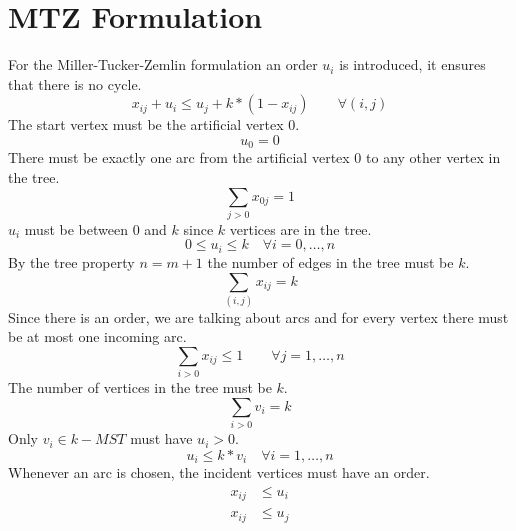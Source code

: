 \documentclass[a4paper]{article}
\numberwithin{equation}{section}
\begin{document}
\section{MTZ Formulation}
For the Miller-Tucker-Zemlin formulation an order $u_i$ is introduced, it ensures that there is no cycle.
\begin{equation}
x_{ij} + u_i \leq u_j + k*(1-x_{ij}) \qquad \forall (i,j)
\end{equation}
The start vertex must be the artificial vertex $0$.
\begin{equation}
	u_0=0
\end{equation}
There must be exactly one arc from the artificial vertex $0$ to any other vertex in the tree.
\begin{equation}
	\sum_{j>0} x_{0j} = 1
\end{equation}
$u_i$ must be between $0$ and $k$ since $k$ vertices are in the tree.
\begin{equation}
0\leq u_i \leq k \quad \forall i=0,\dots,n
\end{equation}
By the tree property $n=m+1$ the number of edges in the tree must be $k$.
\begin{equation}
	\sum_{(i,j)} x_{ij} = k
\end{equation}
Since there is an order, we are talking about arcs and for every vertex there must be at most one incoming arc.
\begin{equation}
	\sum_{i>0} x_{ij}\leq 1 \qquad \forall j=1,\dots,n
\end{equation}
The number of vertices in the tree must be $k$.
\begin{equation}
	\sum_{i>0}v_i=k
\end{equation}
Only $v_i \in k-MST$ must have $u_i>0$.
\begin{equation}
	u_i \leq k*v_i	\quad \forall i=1,\dots,n
\end{equation}
Whenever an arc is chosen, the incident vertices must have an order.
\begin{align}
	x_{ij} &\leq u_i \\
	x_{ij} &\leq u_j 
\end{align}
\end{document}

